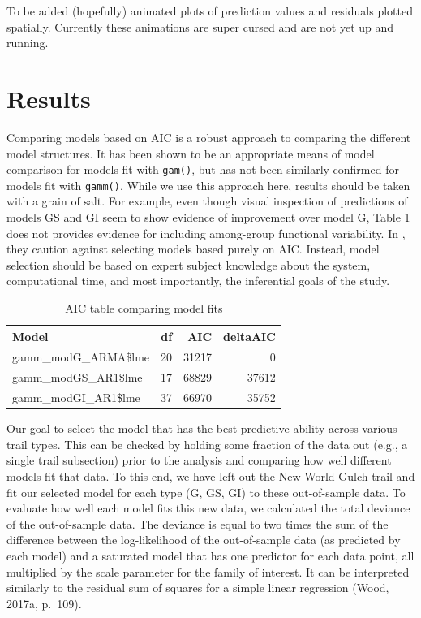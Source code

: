 \documentclass[
]{book}
\begin{document}
To be added (hopefully) animated plots of prediction values and residuals plotted spatially. Currently these animations are super cursed and are not yet up and running.

\hypertarget{results}{%
\section{Results}\label{results}}

Comparing models based on AIC is a robust approach to comparing the different model structures. It has been shown to be an appropriate means of model comparison for models fit with \texttt{gam()}, but has not been similarly confirmed for models fit with \texttt{gamm()}. While we use this approach here, results should be taken with a grain of salt. For example, even though visual inspection of predictions of models GS and GI seem to show evidence of improvement over model G, Table \ref{tab:AICkable} does not provides evidence for including among-group functional variability. In \citet{pedersen2019hierarchical}, they caution against selecting models based purely on AIC. Instead, model selection should be based on expert subject knowledge about the system, computational time, and most importantly, the inferential goals of the study.

\begin{table}

\caption{\label{tab:AICkable}AIC table comparing model fits}
\centering
\begin{tabular}[t]{lrrr}
\toprule
Model & df & AIC & deltaAIC\\
\midrule
gamm\_modG\_ARMA\$lme & 20 & 31217 & 0\\
gamm\_modGS\_AR1\$lme & 17 & 68829 & 37612\\
gamm\_modGI\_AR1\$lme & 37 & 66970 & 35752\\
\bottomrule
\end{tabular}
\end{table}

Our goal to select the model that has the best predictive ability across various trail types. This can be checked by holding some fraction of the data out (e.g., a single trail subsection) prior to the analysis and comparing how well different models fit that data. To this end, we have left out the New World Gulch trail and fit our selected model for each type (G, GS, GI) to these out-of-sample data. To evaluate how well each model fits this new data, we calculated the total deviance of the out-of-sample data. The deviance is equal to two times the sum of the difference between the log-likelihood of the out-of-sample data (as predicted by each model) and a saturated model that has one predictor for each data point, all multiplied by the scale parameter for the family of interest. It can be interpreted similarly to the residual sum of squares for a simple linear regression (Wood, 2017a, p.~109).
\end{document}
